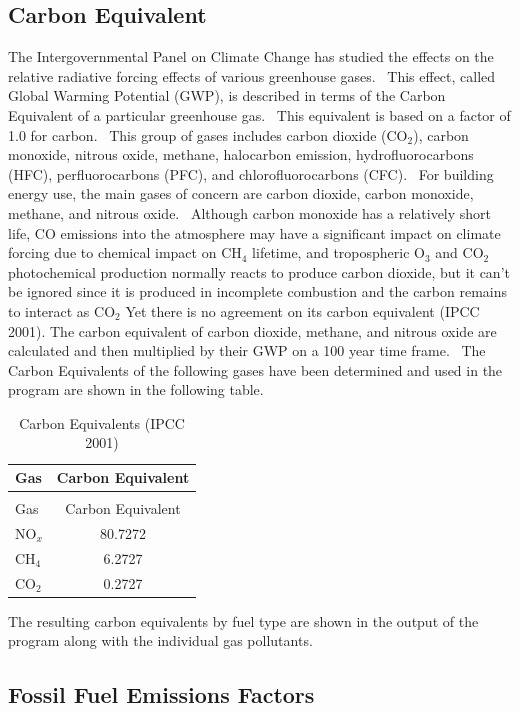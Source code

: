\subsection{Carbon Equivalent}\label{carbon-equivalent}

The Intergovernmental Panel on Climate Change has studied the effects on the relative radiative forcing effects of various greenhouse gases.~ This effect, called Global Warming Potential (GWP), is described in terms of the Carbon Equivalent of a particular greenhouse gas.~ This equivalent is based on a factor of 1.0 for carbon.~ This group of gases includes carbon dioxide (CO\(_{2}\)), carbon monoxide, nitrous oxide, methane, halocarbon emission, hydrofluorocarbons (HFC), perfluorocarbons (PFC), and chlorofluorocarbons (CFC).~ For building energy use, the main gases of concern are carbon dioxide, carbon monoxide, methane, and nitrous oxide.~ Although carbon monoxide has a relatively short life, CO emissions into the atmosphere may have a significant impact on climate forcing due to chemical impact on CH\(_{4}\) lifetime, and tropospheric O\(_{3}\) and CO\(_{2}\) photochemical production normally reacts to produce carbon dioxide, but it can't be ignored since it is produced in incomplete combustion and the carbon remains to interact as CO\(_{2}\) Yet there is no agreement on its carbon equivalent (IPCC 2001). The carbon equivalent of carbon dioxide, methane, and nitrous oxide are calculated and then multiplied by their GWP on a 100 year time frame.~ The Carbon Equivalents of the following gases have been determined and used in the program are shown in the following table.

\begin{longtable}[c]{@{}lc@{}}
\caption{Carbon Equivalents (IPCC 2001) \label{table:carbon-equivalents-ipcc-2001}} \tabularnewline
\toprule
Gas & Carbon Equivalent \tabularnewline
\midrule
\endfirsthead

\caption[]{Carbon Equivalents (IPCC 2001)} \tabularnewline
\toprule
Gas & Carbon Equivalent \tabularnewline
\midrule
\endhead

NO\(_x\) & 80.7272 \tabularnewline
CH\(_4\) & 6.2727 \tabularnewline
CO\(_2\) & 0.2727 \tabularnewline
\bottomrule
\end{longtable}

The resulting carbon equivalents by fuel type are shown in the output of the program along with the individual gas pollutants.

\subsection{Fossil Fuel Emissions Factors}\label{fossil-fuel-emissions-factors}

